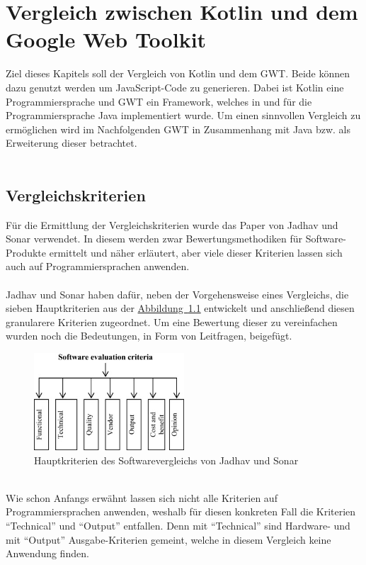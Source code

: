 
\chapter{Vergleich zwischen Kotlin und dem Google Web Toolkit}
Ziel dieses Kapitels soll der Vergleich von Kotlin und dem \gls{GWT}. Beide können dazu genutzt werden um JavaScript-Code zu generieren. Dabei ist Kotlin eine Programmiersprache und \gls{GWT} ein Framework, welches in und für die Programmiersprache Java implementiert wurde. Um einen sinnvollen Vergleich zu ermöglichen wird im Nachfolgenden \gls{GWT} in Zusammenhang mit Java bzw. als Erweiterung dieser betrachtet.\\
\\

\section{Vergleichskriterien}\label{sec:comparisonCriteria}
Für die Ermittlung der Vergleichskriterien wurde das Paper \cite{frameworkEvaluation} von Jadhav und Sonar verwendet. In diesem werden zwar Bewertungsmethodiken für Software-Produkte ermittelt und näher erläutert, aber viele dieser Kriterien lassen sich auch auf Programmiersprachen anwenden. \\
\\
Jadhav und Sonar haben dafür, neben der Vorgehensweise eines Vergleichs, die sieben Hauptkriterien aus der \hyperref[fig:comparisionCriteria]{Abbildung~\ref{fig:comparisionCriteria}} entwickelt und anschließend diesen granularere Kriterien zugeordnet. Um eine Bewertung dieser zu vereinfachen wurden noch die Bedeutungen, in Form von Leitfragen, beigefügt.\\
\begin{figure}[htb]
	\includegraphics[width=0.5\textwidth]{images/comparision-criteria.jpg}
	\caption{Hauptkriterien des Softwarevergleichs von Jadhav und Sonar \cite{frameworkEvaluation}}
	\label{fig:comparisionCriteria}
\end{figure}
\\
Wie schon Anfangs erwähnt lassen sich nicht alle Kriterien auf Programmiersprachen anwenden, weshalb für diesen konkreten Fall die Kriterien \enquote{Technical} und \enquote{Output} entfallen. Denn mit \enquote{Technical} sind Hardware- und mit \enquote{Output} Ausgabe-Kriterien gemeint, welche in diesem Vergleich keine Anwendung finden.\\
 \\
 
